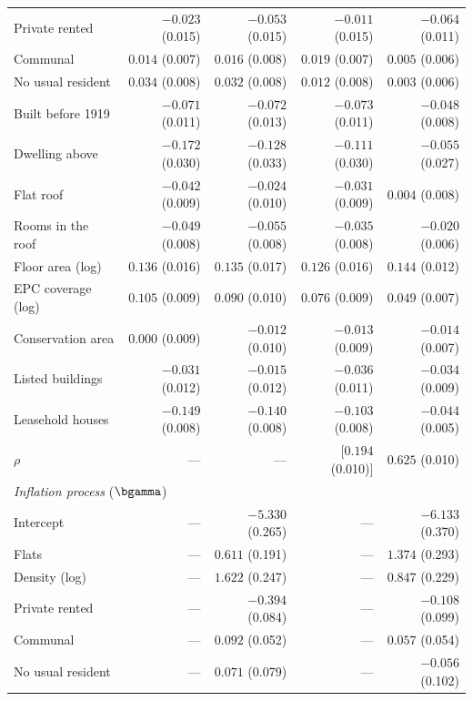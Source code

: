 \begin{table}[htbp]
\begin{tabular}{lrrrr}
Private rented             & $-0.023$ (0.015) & $-0.053$ (0.015) & $-0.011$ (0.015) & $-0.064$ (0.011) \\
Communal                   & $0.014$ (0.007) & $0.016$ (0.008) & $0.019$ (0.007) & $0.005$ (0.006) \\
No usual resident          & $0.034$ (0.008) & $0.032$ (0.008) & $0.012$ (0.008) & $0.003$ (0.006) \\
Built before 1919          & $-0.071$ (0.011) & $-0.072$ (0.013) & $-0.073$ (0.011) & $-0.048$ (0.008) \\
Dwelling above             & $-0.172$ (0.030) & $-0.128$ (0.033) & $-0.111$ (0.030) & $-0.055$ (0.027) \\
Flat roof                  & $-0.042$ (0.009) & $-0.024$ (0.010) & $-0.031$ (0.009) & $0.004$ (0.008) \\
Rooms in the roof          & $-0.049$ (0.008) & $-0.055$ (0.008) & $-0.035$ (0.008) & $-0.020$ (0.006) \\
Floor area (log)           & $0.136$ (0.016) & $0.135$ (0.017) & $0.126$ (0.016) & $0.144$ (0.012) \\
EPC coverage (log)         & $0.105$ (0.009) & $0.090$ (0.010) & $0.076$ (0.009) & $0.049$ (0.007) \\
Conservation area          & $0.000$ (0.009) & $-0.012$ (0.010) & $-0.013$ (0.009) & $-0.014$ (0.007) \\
Listed buildings           & $-0.031$ (0.012) & $-0.015$ (0.012) & $-0.036$ (0.011) & $-0.034$ (0.009) \\
Leasehold houses           & $-0.149$ (0.008) & $-0.140$ (0.008) & $-0.103$ (0.008) & $-0.044$ (0.005) \\
$\rho$ & --- & --- & [$0.194$ (0.010)] & $0.625$ (0.010) \\
\midrule
\multicolumn{5}{l}{\textit{Inflation process} ($\bgamma$)} \\
Intercept                  & --- & $-5.330$ (0.265) & --- & $-6.133$ (0.370) \\
Flats                      & --- & $0.611$ (0.191) & --- & $1.374$ (0.293) \\
Density (log)              & --- & $1.622$ (0.247) & --- & $0.847$ (0.229) \\
Private rented             & --- & $-0.394$ (0.084) & --- & $-0.108$ (0.099) \\
Communal                   & --- & $0.092$ (0.052) & --- & $0.057$ (0.054) \\
No usual resident          & --- & $0.071$ (0.079) & --- & $-0.056$ (0.102) \\

\end{tabular}
\end{table}
